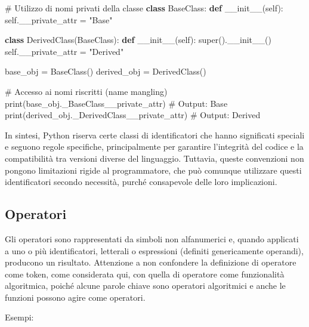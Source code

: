 \documentclass[
  letterpaper,
]{scrbook}
\newenvironment{Shaded}{\begin{snugshade}}{\end{snugshade}}
\newcommand{\BuiltInTok}[1]{\textcolor[rgb]{0.00,0.23,0.31}{#1}}
\newcommand{\CommentTok}[1]{\textcolor[rgb]{0.37,0.37,0.37}{#1}}
\newcommand{\FunctionTok}[1]{\textcolor[rgb]{0.28,0.35,0.67}{#1}}
\newcommand{\KeywordTok}[1]{\textcolor[rgb]{0.00,0.23,0.31}{\textbf{#1}}}
\newcommand{\NormalTok}[1]{\textcolor[rgb]{0.00,0.23,0.31}{#1}}
\newcommand{\OperatorTok}[1]{\textcolor[rgb]{0.37,0.37,0.37}{#1}}
\newcommand{\StringTok}[1]{\textcolor[rgb]{0.13,0.47,0.30}{#1}}
\newcommand{\VariableTok}[1]{\textcolor[rgb]{0.07,0.07,0.07}{#1}}
\begin{document}
\begin{Shaded}
\begin{Highlighting}[]
\CommentTok{\# Utilizzo di nomi privati della classe}
\KeywordTok{class}\NormalTok{ BaseClass:}
    \KeywordTok{def} \FunctionTok{\_\_init\_\_}\NormalTok{(}\VariableTok{self}\NormalTok{):}
        \VariableTok{self}\NormalTok{.\_\_private\_attr }\OperatorTok{=} \StringTok{"Base"}

\KeywordTok{class}\NormalTok{ DerivedClass(BaseClass):}
    \KeywordTok{def} \FunctionTok{\_\_init\_\_}\NormalTok{(}\VariableTok{self}\NormalTok{):}
        \BuiltInTok{super}\NormalTok{().}\FunctionTok{\_\_init\_\_}\NormalTok{()}
        \VariableTok{self}\NormalTok{.\_\_private\_attr }\OperatorTok{=} \StringTok{"Derived"}

\NormalTok{base\_obj }\OperatorTok{=}\NormalTok{ BaseClass()}
\NormalTok{derived\_obj }\OperatorTok{=}\NormalTok{ DerivedClass()}

\CommentTok{\# Accesso ai nomi riscritti (name mangling)}
\BuiltInTok{print}\NormalTok{(base\_obj.\_BaseClass\_\_private\_attr)  }\CommentTok{\# Output: Base}
\BuiltInTok{print}\NormalTok{(derived\_obj.\_DerivedClass\_\_private\_attr)  }\CommentTok{\# Output: Derived}
\end{Highlighting}
\end{Shaded}

In sintesi, Python riserva certe classi di identificatori che hanno
significati speciali e seguono regole specifiche, principalmente per
garantire l'integrità del codice e la compatibilità tra versioni diverse
del linguaggio. Tuttavia, queste convenzioni non pongono limitazioni
rigide al programmatore, che può comunque utilizzare questi
identificatori secondo necessità, purché consapevole delle loro
implicazioni.

\subsection{Operatori}\label{operatori}

Gli operatori sono rappresentati da simboli non alfanumerici e, quando
applicati a uno o più identificatori, letterali o espressioni (definiti
genericamente operandi), producono un risultato. Attenzione a non
confondere la definizione di operatore come token, come considerata qui,
con quella di operatore come funzionalità algoritmica, poiché alcune
parole chiave sono operatori algoritmici e anche le funzioni possono
agire come operatori.

Esempi:
\end{document}
